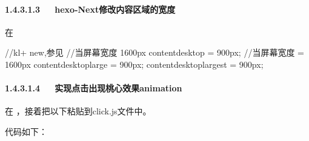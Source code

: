 \documentclass[letterpaper,12pt,english]{sphinxmanual}
\begin{document}
\paragraph{1.4.3.1.3   hexo-Next修改内容区域的宽度}
\label{\detokenize{001software/001install/001._u7f51_u7ad9/hexo:hexo-next}}


在 

\begin{sphinxVerbatim}[commandchars=\\\{\}]
//kl+ new,参见
//当屏幕宽度 \PYGZlt{} 1600px
\PYGZdl{}content\PYGZhy{}desktop                = 900px;
//当屏幕宽度 \PYGZgt{}= 1600px
\PYGZdl{}content\PYGZhy{}desktop\PYGZhy{}large          = 900px;
\PYGZdl{}content\PYGZhy{}desktop\PYGZhy{}largest        = 900px;
\end{sphinxVerbatim}


\paragraph{1.4.3.1.4   实现点击出现桃心效果animation}
\label{\detokenize{001software/001install/001._u7f51_u7ad9/hexo:animation}}
在  ，接着把以下粘贴到click.js文件中。

代码如下：
\end{document}
